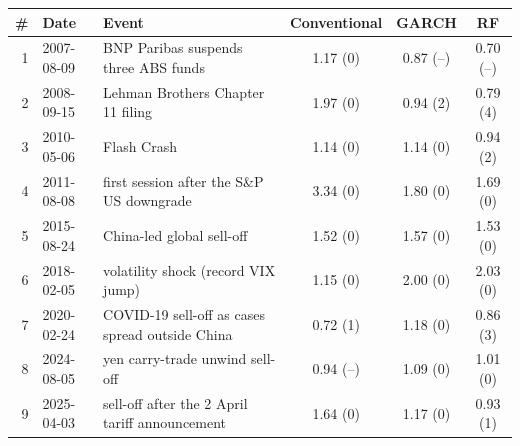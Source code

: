 \begin{tabular}{rl>{\raggedright\arraybackslash}p{6.9cm}ccc}
\toprule
\# & Date & Event & Conventional & GARCH & RF \\
\midrule
1 & 2007-08-09 & BNP Paribas suspends three ABS funds & 1.17 (0) & 0.87 (--) & 0.70 (--) \\
2 & 2008-09-15 & Lehman Brothers Chapter 11 filing & 1.97 (0) & 0.94 (2) & 0.79 (4) \\
3 & 2010-05-06 & Flash Crash & 1.14 (0) & 1.14 (0) & 0.94 (2) \\
4 & 2011-08-08 & first session after the S\&P US downgrade & 3.34 (0) & 1.80 (0) & 1.69 (0) \\
5 & 2015-08-24 & China-led global sell-off & 1.52 (0) & 1.57 (0) & 1.53 (0) \\
6 & 2018-02-05 & volatility shock (record VIX jump) & 1.15 (0) & 2.00 (0) & 2.03 (0) \\
7 & 2020-02-24 & COVID-19 sell-off as cases spread outside China & 0.72 (1) & 1.18 (0) & 0.86 (3) \\
8 & 2024-08-05 & yen carry-trade unwind sell-off & 0.94 (--) & 1.09 (0) & 1.01 (0) \\
9 & 2025-04-03 & sell-off after the 2 April tariff announcement & 1.64 (0) & 1.17 (0) & 0.93 (1) \\
\bottomrule
\end{tabular}
